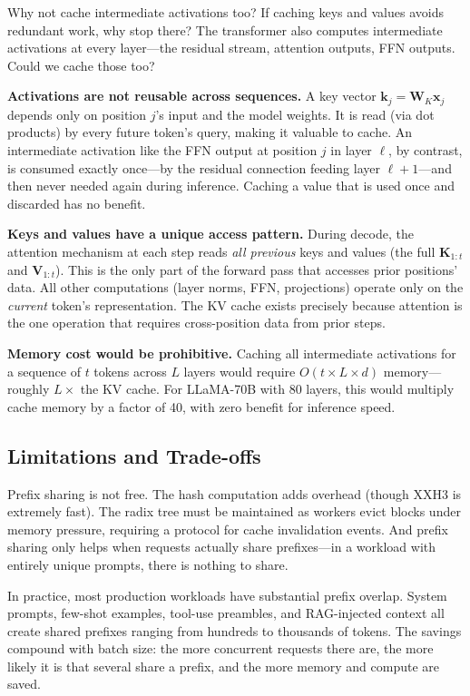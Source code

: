 \begin{whynotbox}{Why not cache intermediate activations too?}
If caching keys and values avoids redundant work, why stop there? The transformer also computes intermediate activations at every layer---the residual stream, attention outputs, FFN outputs. Could we cache those too?

\textbf{Activations are not reusable across sequences.} A key vector $\mathbf{k}_j = \mathbf{W}_K \mathbf{x}_j$ depends only on position $j$'s input and the model weights. It is read (via dot products) by every future token's query, making it valuable to cache. An intermediate activation like the FFN output at position $j$ in layer $\ell$, by contrast, is consumed exactly once---by the residual connection feeding layer $\ell + 1$---and then never needed again during inference. Caching a value that is used once and discarded has no benefit.

\textbf{Keys and values have a unique access pattern.} During decode, the attention mechanism at each step reads \emph{all previous} keys and values (the full $\mathbf{K}_{1:t}$ and $\mathbf{V}_{1:t}$). This is the only part of the forward pass that accesses prior positions' data. All other computations (layer norms, FFN, projections) operate only on the \emph{current} token's representation. The KV cache exists precisely because attention is the one operation that requires cross-position data from prior steps.

\textbf{Memory cost would be prohibitive.} Caching all intermediate activations for a sequence of $t$ tokens across $L$ layers would require $O(t \times L \times d)$ memory---roughly $L \times$ the KV cache. For LLaMA-70B with 80 layers, this would multiply cache memory by a factor of 40, with zero benefit for inference speed.
\end{whynotbox}

\subsection{Limitations and Trade-offs}

Prefix sharing is not free. The hash computation adds overhead (though XXH3 is extremely fast). The radix tree must be maintained as workers evict blocks under memory pressure, requiring a protocol for cache invalidation events. And prefix sharing only helps when requests actually share prefixes---in a workload with entirely unique prompts, there is nothing to share.

In practice, most production workloads have substantial prefix overlap. System prompts, few-shot examples, tool-use preambles, and RAG-injected context all create shared prefixes ranging from hundreds to thousands of tokens. The savings compound with batch size: the more concurrent requests there are, the more likely it is that several share a prefix, and the more memory and compute are saved.

